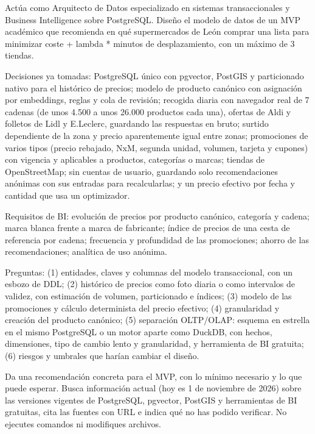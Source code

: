 \begin{tcolorbox}[colback=promptcolor, title=Prompt Introducido, colframe=blue!50!black, breakable]
	Actúa como Arquitecto de Datos especializado en sistemas transaccionales y Business Intelligence sobre PostgreSQL. Diseño el modelo de datos de un MVP académico que recomienda en qué supermercados de León comprar una lista para minimizar coste + lambda * minutos de desplazamiento, con un máximo de 3 tiendas.

	Decisiones ya tomadas: PostgreSQL único con pgvector, PostGIS y particionado nativo para el histórico de precios; modelo de producto canónico con asignación por embeddings, reglas y cola de revisión; recogida diaria con navegador real de 7 cadenas (de unos 4.500 a unos 26.000 productos cada una), ofertas de Aldi y folletos de Lidl y E.Leclerc, guardando las respuestas en bruto; surtido dependiente de la zona y precio aparentemente igual entre zonas; promociones de varios tipos (precio rebajado, NxM, segunda unidad, volumen, tarjeta y cupones) con vigencia y aplicables a productos, categorías o marcas; tiendas de OpenStreetMap; sin cuentas de usuario, guardando solo recomendaciones anónimas con sus entradas para recalcularlas; y un precio efectivo por fecha y cantidad que usa un optimizador.

	Requisitos de BI: evolución de precios por producto canónico, categoría y cadena; marca blanca frente a marca de fabricante; índice de precios de una cesta de referencia por cadena; frecuencia y profundidad de las promociones; ahorro de las recomendaciones; analítica de uso anónima.

	Preguntas: (1) entidades, claves y columnas del modelo transaccional, con un esbozo de DDL; (2) histórico de precios como foto diaria o como intervalos de validez, con estimación de volumen, particionado e índices; (3) modelo de las promociones y cálculo determinista del precio efectivo; (4) granularidad y creación del producto canónico; (5) separación OLTP/OLAP: esquema en estrella en el mismo PostgreSQL o un motor aparte como DuckDB, con hechos, dimensiones, tipo de cambio lento y granularidad, y herramienta de BI gratuita; (6) riesgos y umbrales que harían cambiar el diseño.

	Da una recomendación concreta para el MVP, con lo mínimo necesario y lo que puede esperar. Busca información actual (hoy es 1 de noviembre de 2026) sobre las versiones vigentes de PostgreSQL, pgvector, PostGIS y herramientas de BI gratuitas, cita las fuentes con URL e indica qué no has podido verificar. No ejecutes comandos ni modifiques archivos.
\end{tcolorbox}

